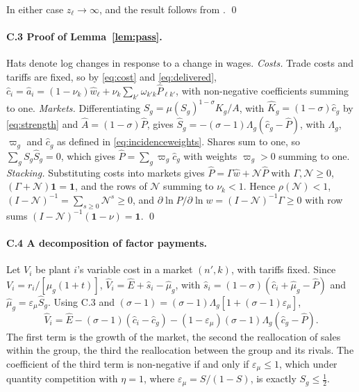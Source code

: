 \documentclass[11pt]{article}
\theoremstyle{definition}
\theoremstyle{remark}
\begin{document}
In either case $z_\ell\to\infty$, and the result follows from
\citet[Proposition 17.C.1]{MWG1995}. \qed

\paragraph{C.3 Proof of Lemma~\ref{lem:pass}.} Hats denote log changes in response to
a change in wages. \emph{Costs.} Trade costs and tariffs are fixed, so by \eqref{eq:cost} and
\eqref{eq:delivered}, $\hat c_i=\hat a_i=(1-\nu_k)\hat w_\ell+\nu_k\sum_{k'}\omega_{k'k}\hat P_{\ell k'}$, with non-negative coefficients
summing to one. \emph{Markets.} Differentiating $S_g=\mu(S_g)^{1-\sigma}K_g/A$, with
$\hat K_g=(1-\sigma)\hat c_g$ by \eqref{eq:strength} and $\hat A=(1-\sigma)\hat P$,
gives $\hat S_g=-(\sigma-1)\Lambda_g(\hat c_g-\hat P)$, with $\Lambda_g$, $\varpi_g$
and $\hat c_g$ as defined in \eqref{eq:incidenceweights}. Shares sum to one, so
$\sum_gS_g\hat S_g=0$, which gives $\hat P=\sum_g\varpi_g\hat c_g$ with weights
$\varpi_g>0$ summing to one. \emph{Stacking.} Substituting costs into markets gives
$\hat P=\Gamma\hat w+\mathcal N\hat P$ with $\Gamma,\mathcal N\ge0$,
$(\Gamma+\mathcal N)\mathbf 1=\mathbf 1$, and the rows of $\mathcal N$ summing to
$\nu_k<1$. Hence $\rho(\mathcal N)<1$, $(I-\mathcal N)^{-1}=\sum_{s\ge0}\mathcal
N^s\ge0$, and $\partial\ln P/\partial\ln w=(I-\mathcal N)^{-1}\Gamma\ge0$ with row sums
$(I-\mathcal N)^{-1}(\mathbf 1-\nu)=\mathbf 1$. \qed

\paragraph{C.4 A decomposition of factor payments.} Let $V_i$ be plant $i$'s variable
cost in a market $(n',k)$, with tariffs fixed. Since $V_i=r_i/[\mu_g(1+t)]$,
$\hat V_i=\hat E+\hat s_i-\hat\mu_g$, with $\hat s_i=(1-\sigma)(\hat c_i+\hat\mu_g-\hat
P)$ and $\hat\mu_g=\varepsilon_\mu\hat S_g$. Using C.3 and
$(\sigma-1)=(\sigma-1)\Lambda_g[1+(\sigma-1)\varepsilon_\mu]$,
\begin{equation}
  \hat V_i=\hat E-(\sigma-1)(\hat c_i-\hat c_g)
  -(1-\varepsilon_\mu)(\sigma-1)\Lambda_g(\hat c_g-\hat P).
  \tag{C.4}\label{eq:vdecomp}
\end{equation}
The first term is the growth of the market, the second the reallocation of sales within
the group, the third the reallocation between the group and its rivals. The coefficient
of the third term
is non-negative if and only if $\varepsilon_\mu\le1$, which under quantity competition
with $\eta=1$, where $\varepsilon_\mu=S/(1-S)$, is exactly $S_g\le\frac12$.
\end{document}
